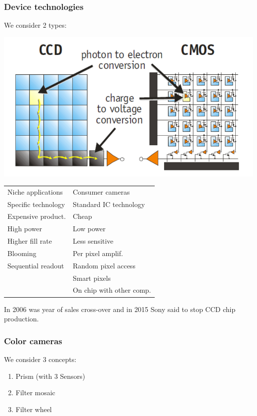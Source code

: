 \documentclass[a4paper, fontsize=8pt, landscape, DIV=1]{scrartcl}
\begin{document}
\begin{multicols*}{4}
		\subsubsection{Device technologies}
		We consider 2 types: 
		\begin{center}
			\includegraphics[width=0.7\columnwidth]{images//ImageAcq/ccd_cmos.png}\\
		\end{center}
		\begin{tabular}{l l}
			\hline 
			\hline
			\thead{CCD} &  \thead{CMOS}  \\ 
			\hline
			Niche applications    & Consumer cameras  \\ 
			Specific technology   & Standard IC technology\\ 
			Expensive product.	  & Cheap \\ 
			High power 			  & Low power \\ 
			Higher fill rate 	  & Less sensitive  \\ 
			Blooming			  & Per pixel amplif. \\ 
			Sequential readout	  & Random pixel access\\ 
								  & Smart pixels \\
								  & On chip with other comp.\\
			\hline 
			\hline
		\end{tabular}
		\par
		In 2006 was year of sales cross-over and in 2015 Sony said to stop CCD chip production. 
		\subsubsection{Color cameras}
		We consider 3 concepts: 
		\begin{enumerate}[noitemsep]
			\item Prism (with 3 Sensors)
			\item Filter mosaic 
			\item Filter wheel 
		\end{enumerate}
		\vfill\null
		\columnbreak
		

\end{multicols*}
\end{document}
